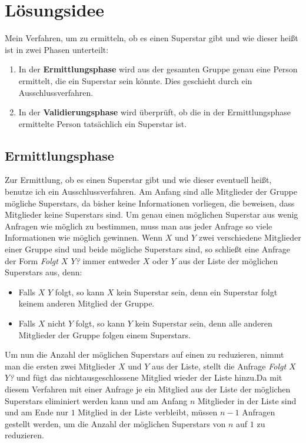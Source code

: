 \documentclass[a4paper,10pt,ngerman]{scrartcl}
\title{\Aufgabe}
\author{\Name\\Team-ID: \TeamId}
\date{\today}
\begin{document}
\maketitle
\tableofcontents
\clearpage

\section{Lösungsidee}
Mein Verfahren, um zu ermitteln, ob es einen Superstar gibt und wie dieser heißt ist in zwei Phasen unterteilt:
\begin{enumerate}
\item In der \textbf{Ermittlungsphase} wird aus der gesamten Gruppe genau eine Person ermittelt, die ein Superstar sein könnte. Dies geschieht durch ein Ausschlussverfahren.
\item In der \textbf{Validierungsphase} wird überprüft, ob die in der Ermittlungsphase ermittelte Person tatsächlich ein Superstar ist.
\end{enumerate}

\subsection{Ermittlungsphase}
Zur Ermittlung, ob es einen Superstar gibt und wie dieser eventuell heißt, benutze ich ein Ausschlussverfahren. Am Anfang sind alle Mitglieder der Gruppe mögliche Superstars, da bisher keine Informationen vorliegen, die beweisen, dass Mitglieder keine Superstars sind. Um genau einen möglichen Superstar aus wenig Anfragen wie möglich zu bestimmen, muss man aus jeder Anfrage so viele Informationen wie möglich gewinnen. Wenn $X$ und $Y$ zwei verschiedene Mitglieder einer Gruppe sind und beide mögliche Superstars sind, so schließt eine Anfrage der Form \textit{Folgt $X$ $Y$?} immer entweder $X$ oder $Y$ aus der Liste der möglichen Superstars aus, denn:
\begin{itemize}
  \item Falls $X$ $Y$ folgt, so kann $X$ kein Superstar sein, denn ein Superstar folgt keinem anderen Mitglied der Gruppe.
  \item Falls $X$ nicht $Y$ folgt, so kann $Y$ kein Superstar sein, denn alle anderen Mitglieder der Gruppe folgen einem Superstars.
\end{itemize}
Um nun die Anzahl der möglichen Superstars auf einen zu reduzieren, nimmt man die ersten zwei Mitglieder $X$ und $Y$ aus der Liste, stellt die Anfrage \textit{Folgt $X$ $Y$?} und fügt das nichtausgeschlossene Mitglied wieder der Liste hinzu.\newline Da mit diesem Verfahren mit einer Anfrage je ein Mitglied aus der Liste der möglichen Superstars eliminiert werden kann und am Anfang $n$ Mitglieder in der Liste sind und am Ende nur $1$ Mitglied in der Liste verbleibt, müssen $n-1$ Anfragen gestellt werden, um die Anzahl der möglichen Superstars von $n$ auf $1$ zu reduzieren.
\end{document}
